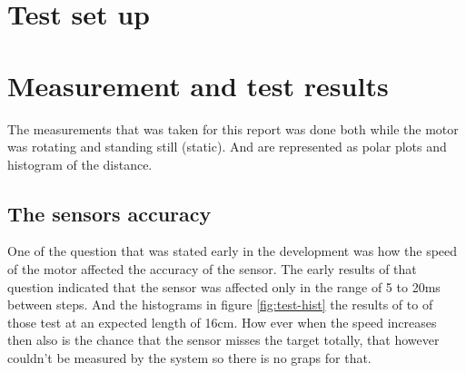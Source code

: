 
\section{Test set up}\label{section:testSetUp}


\section{Measurement and test results}\label{secition:results}
The measurements that was taken for this report was done both while the motor was rotating and standing still (static). And are represented as polar plots and histogram of the distance. 
\subsection{The sensors accuracy}\label{subsubsection:accuracy}
One of the question that was stated early in the development was how the speed of the motor affected the accuracy of the sensor.
The early results of that question indicated that the sensor was affected only in the range of 5 to 20ms between steps.
And the histograms in figure \ref{fig:test-hist} the results of to of those test at an expected length of 16cm. How ever when the speed increases then also is the chance that the sensor misses the target totally, that however couldn't be measured by the system so there is no graps for that. 

